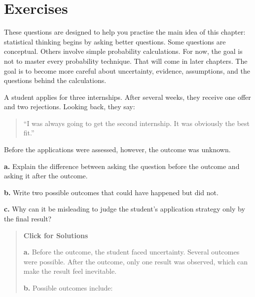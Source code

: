 \documentclass[
  letterpaper,
  DIV=11,
  numbers=noendperiod]{scrreprt}
\begin{document}
\section{Exercises}\label{exercises}

These questions are designed to help you practise the main idea of this
chapter: statistical thinking begins by asking better questions. Some
questions are conceptual. Others involve simple probability
calculations. For now, the goal is not to master every probability
technique. That will come in later chapters. The goal is to become more
careful about uncertainty, evidence, assumptions, and the questions
behind the calculations.

\begin{tcolorbox}[enhanced jigsaw, arc=.35mm, bottomrule=.15mm, bottomtitle=1mm, breakable, colback=white, colbacktitle=quarto-callout-note-color!10!white, colframe=quarto-callout-note-color-frame, coltitle=black, left=2mm, leftrule=.75mm, opacityback=0, opacitybacktitle=0.6, rightrule=.15mm, title=\textcolor{quarto-callout-note-color}{\faInfo}\hspace{0.5em}{Question 1}, titlerule=0mm, toprule=.15mm, toptitle=1mm]

A student applies for three internships. After several weeks, they
receive one offer and two rejections. Looking back, they say:

\begin{quote}
``I was always going to get the second internship. It was obviously the
best fit.''
\end{quote}

Before the applications were assessed, however, the outcome was unknown.

\textbf{a.} Explain the difference between asking the question before
the outcome and asking it after the outcome.

\textbf{b.} Write two possible outcomes that could have happened but did
not.

\textbf{c.} Why can it be misleading to judge the student's application
strategy only by the final result?

\begin{quote}
\textbf{Click for Solutions}

\textbf{a.} Before the outcome, the student faced uncertainty. Several
outcomes were possible. After the outcome, only one result was observed,
which can make the result feel inevitable.

\textbf{b.} Possible outcomes include:


\end{quote}
\end{tcolorbox}
\end{document}
